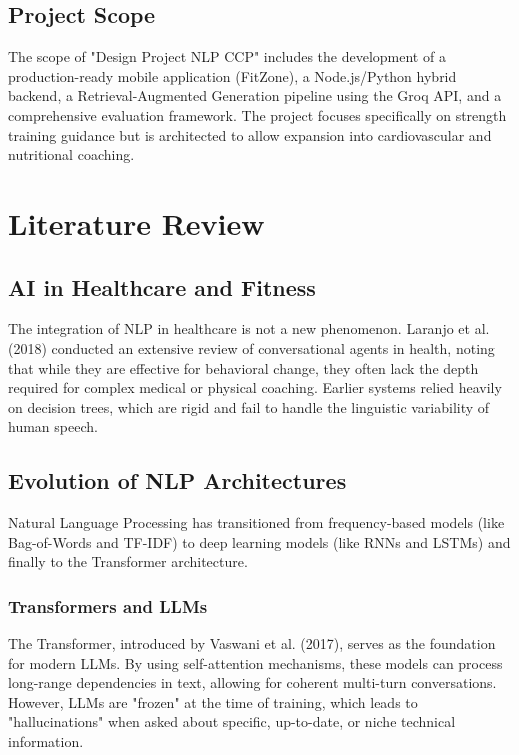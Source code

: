 \documentclass[12pt,a4paper]{report}
\begin{document}
\section{Project Scope}
The scope of "Design Project NLP CCP" includes the development of a production-ready mobile application (FitZone), a Node.js/Python hybrid backend, a Retrieval-Augmented Generation pipeline using the Groq API, and a comprehensive evaluation framework. The project focuses specifically on strength training guidance but is architected to allow expansion into cardiovascular and nutritional coaching.

\chapter{Literature Review}

\section{AI in Healthcare and Fitness}
The integration of NLP in healthcare is not a new phenomenon. Laranjo et al. (2018) conducted an extensive review of conversational agents in health, noting that while they are effective for behavioral change, they often lack the depth required for complex medical or physical coaching. Earlier systems relied heavily on decision trees, which are rigid and fail to handle the linguistic variability of human speech.

\section{Evolution of NLP Architectures}
Natural Language Processing has transitioned from frequency-based models (like Bag-of-Words and TF-IDF) to deep learning models (like RNNs and LSTMs) and finally to the Transformer architecture.
\subsection{Transformers and LLMs}
The Transformer, introduced by Vaswani et al. (2017), serves as the foundation for modern LLMs. By using self-attention mechanisms, these models can process long-range dependencies in text, allowing for coherent multi-turn conversations. However, LLMs are "frozen" at the time of training, which leads to "hallucinations" when asked about specific, up-to-date, or niche technical information.
\end{document}
